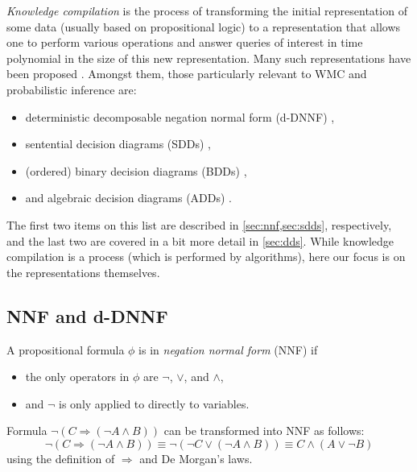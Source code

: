 \emph{Knowledge compilation} is the process of transforming the initial
representation of some data (usually based on propositional logic) to a
representation that allows one to perform various operations and answer queries
of interest in time polynomial in the size of this new representation. Many such
representations have been proposed \citep{DBLP:journals/jair/DarwicheM02}.
Amongst them, those particularly relevant to WMC and probabilistic inference
are:
\begin{itemize}
  \item deterministic decomposable negation normal form (d-DNNF)
        \citep{DBLP:journals/jancl/Darwiche01},
  \item sentential decision diagrams (SDDs) \citep{DBLP:conf/ijcai/Darwiche11},
  \item (ordered) binary decision diagrams (BDDs)
        \citep{DBLP:journals/tc/Bryant86},
  \item and algebraic decision diagrams (ADDs)
        \citep{DBLP:journals/fmsd/BaharFGHMPS97}.
\end{itemize}
The first two items on this list are described in \cref{sec:nnf,sec:sdds},
respectively, and the last two are covered in a bit more detail in
\cref{sec:dds}. While knowledge compilation is a process (which is performed by
algorithms), here our focus is on the representations themselves.

\subsection{NNF and d-DNNF}\label{sec:nnf}

\begin{definition}
  A propositional formula $\phi$ is in \emph{negation normal form} (NNF) if
  \begin{itemize}
    \item the only operators in $\phi$ are $\neg$, $\lor$, and $\land$,
    \item and $\neg$ is only applied to directly to variables.
  \end{itemize}
\end{definition}

\begin{example}
  Formula $\neg(C \Rightarrow (\neg A \land B))$ can be transformed into NNF as
  follows:
  \[
  \neg(C \Rightarrow (\neg A \land B)) \equiv \neg(\neg C \lor (\neg A \land B)) \equiv C \land (A \lor \neg B)
  \]
  using the definition of $\Rightarrow$ and De Morgan's laws.
\end{example}


